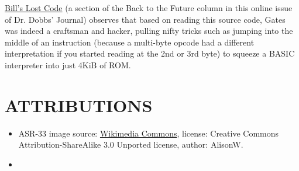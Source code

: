 \documentclass{article}
\begin{document}
\href{http://www.drdobbs.com/back-to-the-future/184404733}{Bill's
  Lost Code} (a section of the Back to the Future column in this online
issue of Dr. Dobbs' Journal) observes that based on reading this source
code, Gates was indeed a craftsman and hacker, pulling nifty tricks such
as jumping into the middle of an instruction (because a multi-byte
opcode had a different interpretation if you started reading at the 2nd
or 3rd byte) to squeeze a BASIC interpreter into just 4KiB of ROM.


\section{ATTRIBUTIONS}

\begin{itemize}
\item ASR-33 image source:
  \href{http://en.wikipedia.org/wiki/File:Teletype_with_papertape_punch_and_reader.jpg}{Wikimedia
    Commons}, license: Creative Commons Attribution-ShareAlike 3.0
  Unported license, author: AlisonW.
\item 
\end{itemize}



\end{document}
